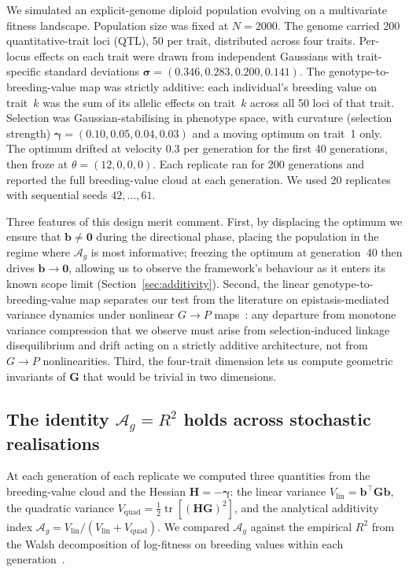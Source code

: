 \documentclass[9pt,twocolumn,twoside,lineno]{gsajnl}
\newcommand{\vect}[1]{\boldsymbol{#1}}
\newcommand{\mat}[1]{\mathbf{#1}}
\newcommand{\tr}{\ensuremath{\operatorname{tr}}\xspace}
\newcommand{\Ag}{\ensuremath{\mathcal{A}_{g}}\xspace}
\newcommand{\Vlin}{\ensuremath{V_{\text{lin}}}\xspace}
\newcommand{\Vquad}{\ensuremath{V_{\text{quad}}}\xspace}
\begin{document}
We simulated an explicit-genome diploid population evolving on a multivariate fitness landscape. Population size was fixed at $N=2000$. The genome carried 200 quantitative-trait loci (QTL), 50 per trait, distributed across four traits. Per-locus effects on each trait were drawn from independent Gaussians with trait-specific standard deviations $\bm{\sigma} = (0.346, 0.283, 0.200, 0.141)$. The genotype-to-breeding-value map was strictly additive: each individual's breeding value on trait~$k$ was the sum of its allelic effects on trait~$k$ across all 50 loci of that trait. Selection was Gaussian-stabilising in phenotype space, with curvature (selection strength) $\bm{\gamma} = (0.10, 0.05, 0.04, 0.03)$ and a moving optimum on trait~1 only. The optimum drifted at velocity $0.3$ per generation for the first 40 generations, then froze at $\theta = (12, 0, 0, 0)$. Each replicate ran for 200 generations and reported the full breeding-value cloud at each generation. We used 20 replicates with sequential seeds $42,\ldots,61$.

Three features of this design merit comment. First, by displacing the optimum we ensure that $\vect{b}\neq\vect{0}$ during the directional phase, placing the population in the regime where \Ag is most informative; freezing the optimum at generation~40 then drives $\vect{b}\to\vect{0}$, allowing us to observe the framework's behaviour as it enters its known scope limit (Section~\ref{sec:additivity}). Second, the linear genotype-to-breeding-value map separates our test from the literature on epistasis-mediated variance dynamics under nonlinear $G\!\to\!P$ maps~\citep{CarterHermissonHansen2005,Hansen2013}: any departure from monotone variance compression that we observe must arise from selection-induced linkage disequilibrium and drift acting on a strictly additive architecture, not from $G\!\to\!P$ nonlinearities. Third, the four-trait dimension lets us compute geometric invariants of $\mat{G}$ that would be trivial in two dimensions.

\subsection*{The identity \texorpdfstring{$\Ag = R^2$}{Ag = R\textasciicircum 2} holds across stochastic realisations}

At each generation of each replicate we computed three quantities from the breeding-value cloud and the Hessian $\mat{H}=-\bm{\gamma}$: the linear variance $\Vlin = \vect{b}^{\top}\mat{G}\vect{b}$, the quadratic variance $\Vquad = \tfrac{1}{2}\tr[(\mat{H}\mat{G})^2]$, and the analytical additivity index $\Ag = \Vlin/(\Vlin+\Vquad)$. We compared \Ag against the empirical $R^2$ from the Walsh decomposition of log-fitness on breeding values within each generation~\citep{WalshLynch2018}.
\end{document}
